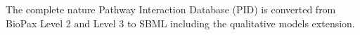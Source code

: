 \documentclass{bioinfo}
\begin{document}
\begin{methods}
%
The complete nature Pathway Interaction Database (PID) is converted from BioPax Level 2 and Level 3 to SBML including the qualitative models extension.


\end{methods}
\end{document}
